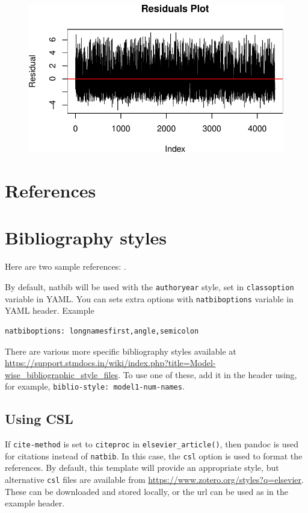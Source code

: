 \documentclass[
  super,
  preprint,
  3p]{elsarticle}
\begin{document}
\begin{figure}[H]

{\centering \includegraphics{project_report_files/figure-pdf/unnamed-chunk-30-1.pdf}

}

\end{figure}

\hypertarget{references}{%
\section*{References}\label{references}}

\hypertarget{bibliography-styles}{%
\section{Bibliography styles}\label{bibliography-styles}}

Here are two sample references: \citet{Feynman1963118}
\citet{Dirac1953888}.

By default, natbib will be used with the \texttt{authoryear} style, set
in \texttt{classoption} variable in YAML. You can sets extra options
with \texttt{natbiboptions} variable in YAML header. Example

\begin{verbatim}
natbiboptions: longnamesfirst,angle,semicolon
\end{verbatim}

There are various more specific bibliography styles available at
\url{https://support.stmdocs.in/wiki/index.php?title=Model-wise_bibliographic_style_files}.
To use one of these, add it in the header using, for example,
\texttt{biblio-style:\ model1-num-names}.

\hypertarget{using-csl}{%
\subsection{Using CSL}\label{using-csl}}

If \texttt{cite-method} is set to \texttt{citeproc} in
\texttt{elsevier\_article()}, then pandoc is used for citations instead
of \texttt{natbib}. In this case, the \texttt{csl} option is used to
format the references. By default, this template will provide an
appropriate style, but alternative \texttt{csl} files are available from
\url{https://www.zotero.org/styles?q=elsevier}. These can be downloaded
and stored locally, or the url can be used as in the example header.


  
\end{document}
